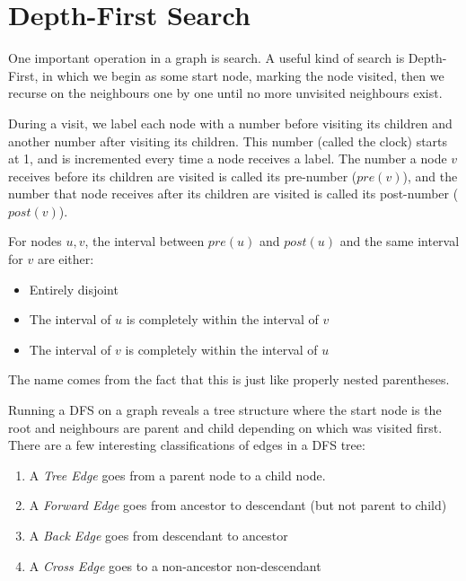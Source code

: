 \chapter{Depth-First Search}

One important operation in a graph is search.  A useful kind of search
is Depth-First, in which we begin as some start node, marking the node
visited, then we recurse on the neighbours one by one until no more
unvisited neighbours exist.

During a visit, we label each node with a number before visiting its
children and another number after visiting its children.  This number
(called the clock) starts at 1, and is incremented every time a node
receives a label.  The number a node $v$ receives before its children
are visited is called its pre-number ($pre(v)$), and the number that
node receives after its children are visited is called its post-number
($post(v)$).

\begin{theorem}

For nodes $u,v$, the interval between $pre(u)$ and $post(u)$ and the
same interval for $v$ are either:

\begin{itemize}

\item Entirely disjoint
\item The interval of $u$ is completely within the interval of $v$
\item The interval of $v$ is completely within the interval of $u$

\end{itemize}

The name comes from the fact that this is just like properly nested
parentheses.

\end{theorem}

Running a DFS on a graph reveals a tree structure where the start node
is the root and neighbours are parent and child depending on which was
visited first.  There are a few interesting classifications of edges
in a DFS tree:

\begin{enumerate}

\item A \emph{Tree Edge} goes from a parent node to a child node.

\item A \emph{Forward Edge} goes from ancestor to descendant (but not
  parent to child)

\item A \emph{Back Edge} goes from descendant to ancestor

\item A \emph{Cross Edge} goes to a non-ancestor non-descendant

\end{enumerate}


